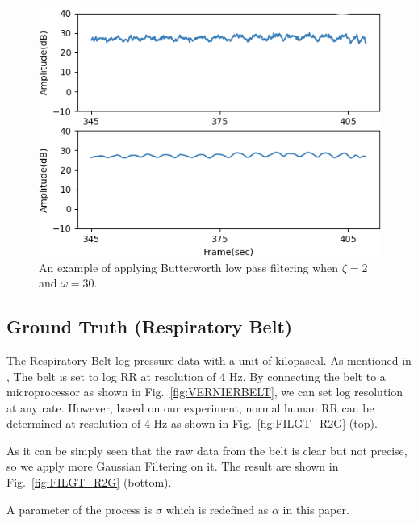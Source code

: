 \documentclass[10pt,letterpaper]{article}
\begin{document}
			\begin{figure}[htbp]
			\centerline{\includegraphics[width=120mm,scale=0.9]{FILPD_L2B.png}}
			\caption{An example of applying Butterworth low pass filtering when $\zeta=2$ and $\omega=30$.}
			\label{fig:BPL}
				\end{figure}
	\subsection*{Ground Truth (Respiratory Belt)}
		
		The Respiratory Belt log pressure data with a unit of kilopascal. As mentioned in , The belt is set to log RR at resolution of 4 Hz. By connecting the belt to a microprocessor as shown in Fig.~\ref{fig:VERNIERBELT}, we can set log resolution at any rate. However, based on our experiment, normal human RR can be determined at resolution of 4 Hz as shown in Fig.~\ref{fig:FILGT_R2G} (top).
		
		As it can be simply seen that the raw data from the belt is clear but not precise, so we apply more Gaussian Filtering on it. The result are shown in Fig.~\ref{fig:FILGT_R2G} (bottom).
		
		A parameter of the process is $\sigma$ which is redefined as $\alpha$ in this paper.
		
\end{document}
